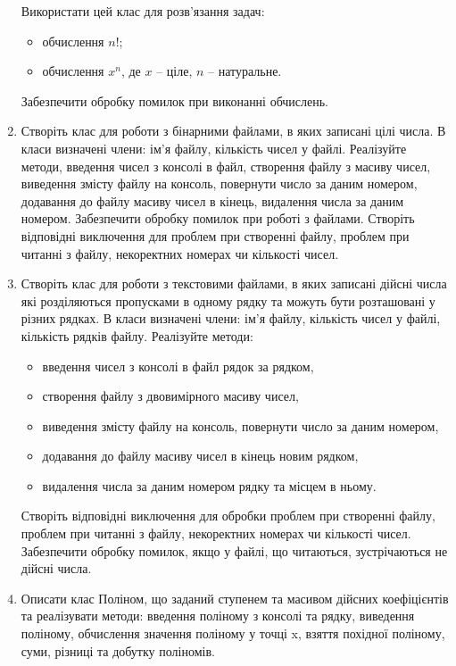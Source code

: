 \documentclass[a5paper,titlepage,openany,twoside,draft]{book_unv}%
\begin{document}
\begin{enumerate}
Використати цей клас для розв'язання задач:
\begin{itemize}
\item
обчислення $n!$;
\item
обчислення $x^{n}$, де $x$ -- ціле, $n$ -- натуральне.
\end{itemize}
Забезпечити обробку помилок при виконанні обчислень.


\item
Створіть клас для роботи з бінарними файлами, в яких записані цілі числа.
В класи визначені члени: ім'я файлу, кількість чисел у файлі.
Реалізуйте методи, введення чисел з консолі в файл, створення файлу з масиву чисел,
виведення змісту файлу на консоль, повернути число за даним номером, 
додавання до файлу масиву чисел в кінець, видалення числа за даним номером.
Забезпечити обробку помилок при роботі з файлами. 
Створіть відповідні виключення для проблем при створенні файлу,
проблем при читанні з файлу, некоректних номерах чи кількості чисел. 

\item
Створіть клас для роботи з текстовими файлами, в яких записані дійсні числа
які розділяються пропусками в одному рядку та можуть бути розташовані у
різних рядках.
В класи визначені члени: ім'я файлу, кількість чисел у файлі, кількість рядків файлу.
Реалізуйте методи:
\begin{itemize}
\item
введення чисел з консолі в файл рядок за рядком, 
\item
створення файлу з двовимірного масиву чисел,
\item
виведення змісту файлу на консоль, повернути число за даним номером, 
\item
додавання до файлу масиву чисел в кінець новим рядком, 
\item
видалення числа за даним номером рядку та місцем в ньому.
\end{itemize}

Створіть відповідні виключення для обробки проблем при створенні файлу,
проблем при читанні з файлу, некоректних номерах чи кількості чисел.
Забезпечити обробку помилок, якщо у файлі, що читаються, 
зустрічаються не дійсні числа.

\item

Описати клас Поліном, що заданий ступенем та масивом дійсних коефіцієнтів
та реалізувати методи: введення поліному з консолі та рядку,
виведення поліному, обчислення значення поліному у точці x, взяття
похідної поліному, суми, різниці та добутку поліномів.


\end{enumerate}
\end{document}
